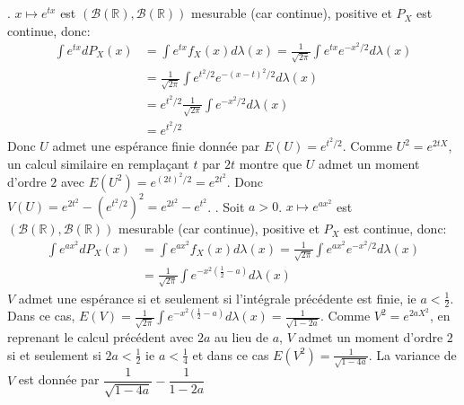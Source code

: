 \documentclass{report}
\begin{document}
\subsection{} \noindent{}\\ 
\\ 
\\
. $x\mapsto e^{tx}$ est $(\mathcal B(\mathbb R),\mathcal B(\mathbb R))$ mesurable (car continue), positive et $P_X$ est continue, donc:
$$ \begin{aligned} \int e^{tx} dP_X(x) &= \int e^{tx} f_X(x) d\lambda(x) = \frac{1}{\sqrt{2\pi }}\int e^{tx} e^{-x^2/2} d\lambda(x)\\
&=\frac{1}{\sqrt{2\pi }} \int e^{t^2/2} e^{-(x-t)^2/2} d\lambda(x) \\
&=e^{t^2/2} \frac{1}{\sqrt{2\pi }}\int e^{-x^2/2} d\lambda(x)\\
&= e^{t^2/2}
 \end{aligned}$$
Donc $U$ admet une espérance finie donnée par $E(U)=e^{t^2/2}$. \newline \newline 
Comme $U^2=e^{2tX}$, un calcul similaire en remplaçant $t$ par $2t$ montre que $U$ admet un moment d'ordre $2$ avec $E(U^2)=e^{(2t)^2/2}=e^{2t^2}$.\newline
Donc $V(U)=e^{2t^2}-(e^{t^2/2})^2=e^{2t^2}-e^{t^2}$. \newline {}. Soit $a>0$. $x\mapsto e^{ax^2}$ est $(\mathcal B(\mathbb R),\mathcal B(\mathbb R))$ mesurable (car continue), positive et $P_X$ est continue, donc:
$$ \begin{aligned} \int e^{ax^2} dP_X(x) &= \int e^{ax^2} f_X(x) d\lambda(x) = \frac{1}{\sqrt{2\pi }}\int e^{ax^2} e^{-x^2/2} d\lambda(x)\\ 
&=\frac{1}{\sqrt{2\pi }} \int e^{-x^2(\frac{1}{2}-a)} d\lambda(x) \end{aligned}$$
$V$ admet une espérance si et seulement si l'intégrale précédente est finie, ie $a<\frac{1}{2}$.\newline
Dans ce cas, $E(V)=\frac{1}{\sqrt{2\pi }} \int e^{-x^2(\frac{1}{2}-a)} d\lambda(x) =\frac{1}{\sqrt{1-2a}}$.\newline \newline
Comme $V^2=e^{2aX^2}$, en reprenant le calcul précédent avec $2a$ au lieu de $a$, $V$ admet un moment d'ordre $2$ si et seulement si $2a<\frac{1}{2}$ ie $a<\frac 14$ et dans ce cas $E(V^2)=\frac{1}{\sqrt{1-4a}}$.\newline
La variance de $V$ est donnée par $\dfrac{1}{\sqrt{1-4a}} - \dfrac{1}{1-2a}$
\end{document}

